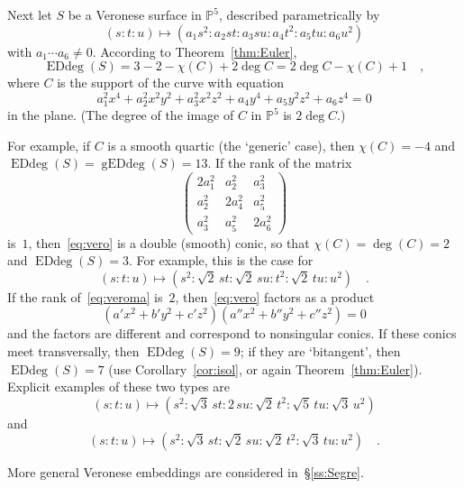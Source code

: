 \documentclass[11pt]{amsart}
\numberwithin{equation}{section}
\newcommand{\Pbb}{{\mathbb{P}}}
\DeclareMathOperator{\Edd}{EDdeg}
\DeclareMathOperator{\gEdd}{gEDdeg}
\begin{document}
Next let $S$ be a Veronese surface in $\Pbb^5$, described parametrically by
\[
(s:t:u) \mapsto (a_1 s^2: a_2 st: a_3 su : a_4 t^2 : a_5 tu : a_6 u^2)
\]
with $a_1\cdots a_6\ne 0$. 
According to Theorem~\ref{thm:Euler},
\[
\Edd(S) = 3-2-\chi(C) +2\deg C= 2\deg C - \chi(C) + 1\quad,
\]
where $C$ is the support of the curve with equation
\begin{equation}\label{eq:vero}
a_1^2 x^4 + a_2^2 x^2 y^2 + a_3^2 x^2 z^2 + a_4 y^4 + a_5 y^2 z^2 + a_6 z^4=0
\end{equation}
in the plane. (The degree of the image of $C$ in $\Pbb^5$ is $2\deg C$.)

For example, if $C$ is a smooth quartic (the `generic' case), then $\chi(C) = -4$ and 
$\Edd(S)=\gEdd(S)=13$. If the rank of the matrix
\begin{equation}\label{eq:veroma}
\begin{pmatrix}
2a_1^2 & a_2^2 & a_3^2 \\
a_2^2 & 2a_4^2 & a_5^2 \\
a_3^2 & a_5^2 & 2a_6^2
\end{pmatrix}
\end{equation}
is~$1$, then~\eqref{eq:vero} is a double (smooth) conic, so that $\chi(C)=\deg(C)=2$ 
and $\Edd(S)=3$. For example, this is the case for
\begin{equation}\label{eq:doublecon}
(s:t:u) \mapsto (s^2: \sqrt 2\, st: \sqrt 2\, su : t^2 : \sqrt 2\, tu : u^2)\quad.
\end{equation}
If the rank of~\eqref{eq:veroma} is~$2$, then~\eqref{eq:vero} factors as a product
\[
(a' x^2 +b'y^2+c'z^2)(a'' x^2 +b''y^2+c''z^2) = 0
\]
and the factors are different and correspond to nonsingular conics. If these conics meet
transversally, then $\Edd(S)=9$; if they are `bitangent', then $\Edd(S)=7$
(use Corollary~\ref{cor:isol}, or again Theorem~\ref{thm:Euler}).
Explicit examples of these two types are
\[
(s:t:u) \mapsto (s^2: \sqrt 3\, st: 2\, su : \sqrt 2\, t^2 : \sqrt 5\, tu : \sqrt 3\,u^2)
\]
and
\[
(s:t:u) \mapsto (s^2: \sqrt 3\, st: \sqrt 2\, su : \sqrt 2\, t^2 : \sqrt 3\, tu : u^2)\quad.
\]

More general Veronese embeddings are considered in~\S\ref{ss:Segre}.
\end{document}
